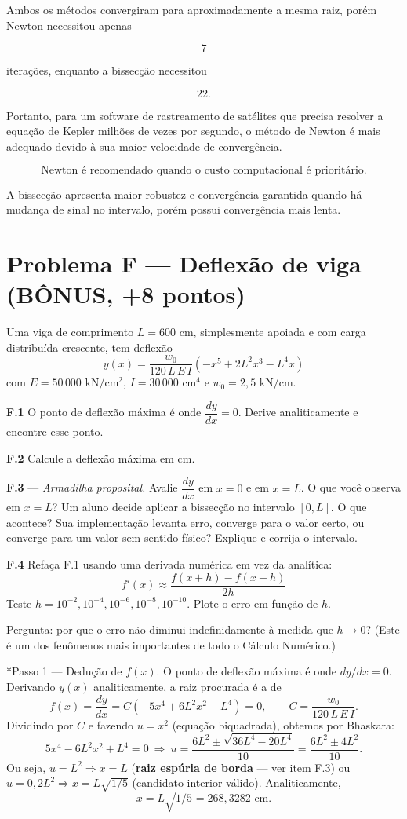 \documentclass[
	12pt,				%
	openright,			%
	a4paper,			%
	english,			%
	french,				%
	spanish,			%
	brazil,				%
	]{abntex2}
\begin{document}
Ambos os métodos convergiram para aproximadamente a mesma raiz, porém Newton
necessitou apenas

\[
7
\]

iterações, enquanto a bissecção necessitou

\[
22.
\]

Portanto, para um software de rastreamento de satélites que precisa resolver a
equação de Kepler milhões de vezes por segundo, o método de Newton é mais
adequado devido à sua maior velocidade de convergência.

\[
\boxed{\text{Newton é recomendado quando o custo computacional é prioritário.}}
\]

A bissecção apresenta maior robustez e convergência garantida quando há mudança
de sinal no intervalo, porém possui convergência mais lenta.

\section*{Problema F \textnormal{---} Deflexão de viga (BÔNUS, +8 pontos)}

Uma viga de comprimento $L = 600\text{ cm}$, simplesmente apoiada e com carga distribuída crescente, tem deflexão
\[
y(x) = \frac{w_0}{120\,L\,E\,I}\left(-x^5 + 2L^2x^3 - L^4x\right)
\]
com $E = 50\,000\text{ kN}/\text{cm}^2$, $I = 30\,000\text{ cm}^4$ e $w_0 = 2{,}5\text{ kN}/\text{cm}$.

\textbf{F.1} O ponto de deflexão máxima é onde $\dfrac{dy}{dx} = 0$. Derive analiticamente e encontre esse ponto.

\textbf{F.2} Calcule a deflexão máxima em cm.

\textbf{F.3} --- \textit{Armadilha proposital.} Avalie $\dfrac{dy}{dx}$ em $x=0$ e em $x=L$. O que você observa em $x=L$? Um aluno decide aplicar a bissecção no intervalo $[0,L]$. O que acontece? Sua implementação levanta erro, converge para o valor certo, ou converge para um valor sem sentido físico? Explique e corrija o intervalo.

\textbf{F.4} Refaça F.1 usando uma derivada numérica em vez da analítica:
\[
f'(x) \approx \frac{f(x+h) - f(x-h)}{2h}
\]
Teste $h = 10^{-2}, 10^{-4}, 10^{-6}, 10^{-8}, 10^{-10}$. Plote o erro em função de $h$.

Pergunta: por que o erro não diminui indefinidamente à medida que $h \to 0$? (Este é um dos fenômenos mais importantes de todo o Cálculo Numérico.)

*{Passo 1 --- Dedução de $f(x)$.}
O ponto de deflexão máxima é onde $dy/dx=0$. Derivando $y(x)$ analiticamente, a raiz procurada é a de
\[
f(x) = \frac{dy}{dx} = C\left(-5x^4 + 6L^2x^2 - L^4\right) = 0, \qquad C = \frac{w_0}{120\,L\,E\,I}.
\]
Dividindo por $C$ e fazendo $u=x^2$ (equação biquadrada), obtemos por Bhaskara:
\[
5x^4 - 6L^2x^2 + L^4 = 0 \ \Longrightarrow\ u = \frac{6L^2 \pm \sqrt{36L^4-20L^4}}{10} = \frac{6L^2\pm4L^2}{10}.
\]
Ou seja, $u=L^2 \Rightarrow x=L$ (\textbf{raiz espúria de borda} --- ver item F.3) ou $u=0{,}2L^2 \Rightarrow x = L\sqrt{1/5}$ (candidato interior válido). Analiticamente,
\[
x = L\sqrt{1/5} = 268{,}3282\text{ cm}.
\]
\end{document}
